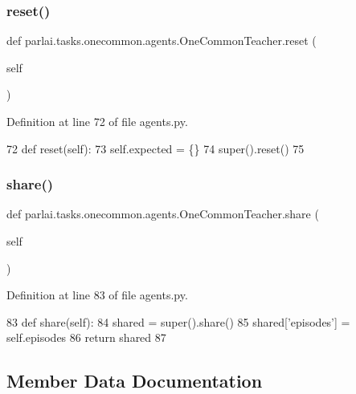 \subsubsection{\texorpdfstring{reset()}{reset()}}
{\footnotesize\ttfamily def parlai.\+tasks.\+onecommon.\+agents.\+One\+Common\+Teacher.\+reset (\begin{DoxyParamCaption}\item[{}]{self }\end{DoxyParamCaption})}



Definition at line 72 of file agents.\+py.


\begin{DoxyCode}
72     \textcolor{keyword}{def }reset(self):
73         self.expected = \{\}
74         super().reset()
75 
\end{DoxyCode}
\mbox{\label{classparlai_1_1tasks_1_1onecommon_1_1agents_1_1OneCommonTeacher_aca977bb2656a4cd3cd749c814d1e8bd1}} 
\subsubsection{\texorpdfstring{share()}{share()}}
{\footnotesize\ttfamily def parlai.\+tasks.\+onecommon.\+agents.\+One\+Common\+Teacher.\+share (\begin{DoxyParamCaption}\item[{}]{self }\end{DoxyParamCaption})}



Definition at line 83 of file agents.\+py.


\begin{DoxyCode}
83     \textcolor{keyword}{def }share(self):
84         shared = super().share()
85         shared[\textcolor{stringliteral}{'episodes'}] = self.episodes
86         \textcolor{keywordflow}{return} shared
87 
\end{DoxyCode}


\subsection{Member Data Documentation}
\mbox{\label{classparlai_1_1tasks_1_1onecommon_1_1agents_1_1OneCommonTeacher_a7c95a83fca48d1308296cd641758f6c3}} 
